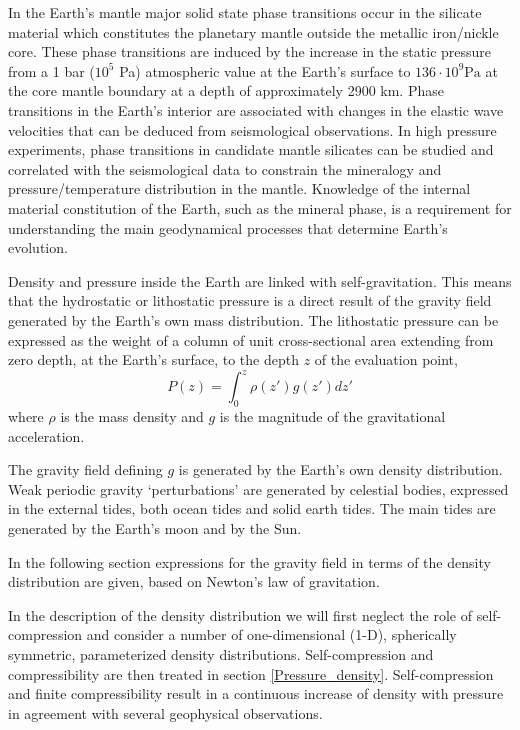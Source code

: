 In the Earth's mantle major solid state phase transitions occur in the 
silicate material which constitutes the planetary mantle
outside the metallic iron/nickle core.
These phase transitions are induced by the increase in the static
pressure from a 1 bar ($10^5$ Pa) atmospheric value at the Earth's surface to 
$136 \cdot 10^9 \mathrm{Pa}$ at the core mantle boundary at a depth of
approximately 2900 km.
Phase transitions in the Earth's interior are associated with changes 
in the elastic wave velocities that can be deduced from seismological 
observations.
In high pressure experiments, phase transitions in candidate mantle
silicates can be studied and correlated with the seismological data
to constrain the mineralogy and pressure/temperature distribution 
in the mantle.
Knowledge of the internal material constitution of the Earth,
such as the mineral phase,
is a requirement for understanding the main geodynamical processes that determine
Earth's evolution.

Density and pressure inside the Earth are linked with self-gravitation.
This means that the hydrostatic or lithostatic pressure is a direct 
result of the gravity field generated by the Earth's own mass 
distribution.
The lithostatic pressure can be expressed as the weight of a column
of unit cross-sectional area extending from zero depth, at the Earth's 
surface, to the depth $z$ of the evaluation point,
\begin{equation}
 P(z) = \int_0^z \rho(z') g(z') dz'
\label{def_pressure_integ}
\end{equation}
where $\rho$ is the mass density and $g$ is the magnitude of
the gravitational acceleration.

The gravity field defining $g$ is generated by the Earth's own density 
distribution.
Weak periodic gravity `perturbations' are generated by celestial
bodies, expressed in the external tides, both ocean tides and solid
earth tides.
The main tides are generated by the Earth's moon and by the Sun.

In the following section expressions for the gravity field in terms
of the density distribution are given, based on Newton's law of
gravitation.

In the description of the density distribution we will first neglect 
the role of self-compression and consider a number of one-dimensional 
(1-D), spherically symmetric, parameterized density distributions.
Self-compression and compressibility are then treated in section 
\ref{Pressure_density}.
Self-compression and finite compressibility result in a 
continuous increase of density with pressure in agreement 
with several geophysical observations.  

